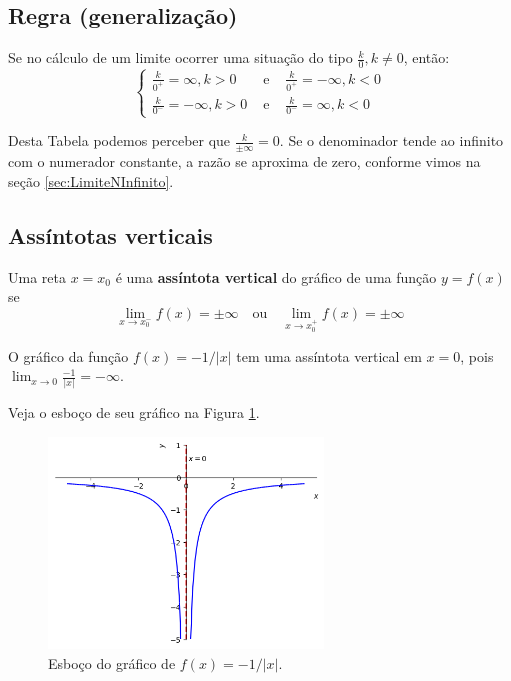 \cleardoublepage\documentclass[../main.tex]{subfiles}
\begin{document}
\subsection{Regra (generalização)}
Se no cálculo de um limite ocorrer uma situação do tipo $\frac{k}{0}, k\neq 0$, então:
$$\left\{\begin{array}{ccc}
     \frac{k}{0^+}=\infty, k>0&  \textrm{ e }&\frac{k}{0^+}=-\infty, k<0\\
   \frac{k}{0^-}=-\infty, k>0&  \textrm{ e }&\frac{k}{0^-}=\infty, k<0
\end{array}\right.$$

Desta Tabela podemos perceber que $\frac{k}{\pm\infty}=0$. Se o denominador tende ao infinito com o
numerador constante, a razão se aproxima de zero, conforme vimos na seção \ref{sec:LimiteNInfinito}.

\subsection{Assíntotas verticais}\hypertarget{AssintVert}{}
Uma reta $x=x_0$ é uma {\bf assíntota vertical} do gráfico de uma função $y = f(x)$ se
\begin{equation*}
  \lim_{x\to x_0^-} f(x) = \pm\infty\quad\text{ou}\quad\lim_{x\to x_0^+} f(x) = \pm\infty
\end{equation*}

\begin{ex}
  O gráfico da função $f(x)=-1/|x|$ tem uma assíntota vertical em $x=0$, pois $\lim_{x\to 0} \frac{-1}{|x|} = -\infty$.

   Veja o esboço de seu gráfico na Figura \ref{fig:ex_lim_assvert_1}.

  \begin{figure}[H]
    \centering
    \includegraphics[width=0.65\textwidth]{fig_lim/fig_ex_lim_assvert_1}
    \caption{Esboço do gráfico de $f(x)=-1/|x|$.}
    \label{fig:ex_lim_assvert_1}
  \end{figure}  
\end{ex}
\renewcommand{\CancelColor}{\color{red}}%
\end{document}
